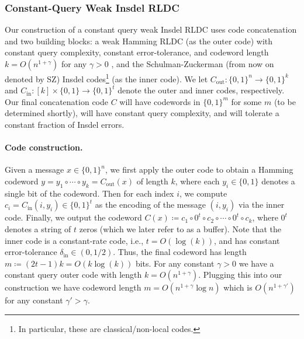 \documentclass[10pt,a4paper]{article}
\theoremstyle{remark}
\newcommand{\zo}{\ensuremath{{\{0,1\}}}\xspace}
\newcommand{\authnote}[3]{\textcolor{#2}{{\sf (#1's Note: {\sl{#3}})}}}
\newcommand{\minshen}{\authnote{Minshen}{purple}}
\newcommand{\enote}{\authnote{Elena}{green}}
\newcommand{\alex}[1]{\authnote{Alex}{orange}{#1}}
\newcommand{\authnote}{}
\newcommand{\minshen}[1]{}
\newcommand{\enote}[1]{}
\newcommand{\alex}[1]{}
\newcommand{\Cout}{C_{\text{out}}}
\newcommand{\Cin}{C_{\text{in}}}
\newcommand{\din}{\delta_{\text{in}}}
\begin{document}
\subsubsection{Constant-Query Weak Insdel RLDC}
Our construction of a constant query weak Insdel RLDC uses code concatenation and two building blocks: a weak Hamming RLDC (as the outer code) with constant query complexity, constant error-tolerance, and codeword length $k = O(n^{1+\gamma})$ for any $\gamma > 0$ \cite{Ben-SassonGHSV06}, and the Schulman-Zuckerman \cite{SchZuc99} (from now on denoted by SZ) Insdel codes\footnote{In particular, these are classical/non-local codes.} (as the inner code).
We let $\Cout \colon \zo^n \rightarrow \zo^k$ and $\Cin \colon [k] \times \zo \rightarrow \zo^t$ denote the outer and inner codes, respectively.
Our final concatenation code $C$ will have codewords in $\zo^m$ for some $m$ (to be determined shortly), will have constant query complexity, and will tolerate a constant fraction of Insdel errors.

\paragraph{Code construction.}
Given a message $x \in \zo^n$, we first apply the outer code to obtain a Hamming codeword $y = y_1 \circ \cdots \circ y_k = \Cout(x)$ of length $k$, where each $y_i \in \{0,1\}$ denotes a single bit of the codeword. 
Then for each index $i$, we compute $c_i = \Cin(i, y_i) \in \{0,1\}^t$ as the encoding of the message $(i, y_i)$ via the inner code. 
Finally, we output the codeword $C(x) \coloneqq c_1 \circ 0^t \circ c_2 \circ \cdots \circ  0^t \circ c_k$, where $0^t$ denotes a string of $t$ zeros (which we later refer to as a buffer). 
Note that the inner code is a constant-rate code, i.e., $t = O(\log(k))$, and has constant error-tolerance $\din \in (0,1/2)$.
Thus, the final codeword has length $m \coloneqq (2t-1)k = O(k \log(k))$ bits. 
For any constant $\gamma > 0$ we have a constant query outer code with length $k = O(n^{1+\gamma})$. 
Plugging this into our construction we have codeword length $ m = O( n^{1+\gamma} \log n)$ which is $O(n^{1+\gamma'})$ for any constant $\gamma' > \gamma$. %
\end{document}
